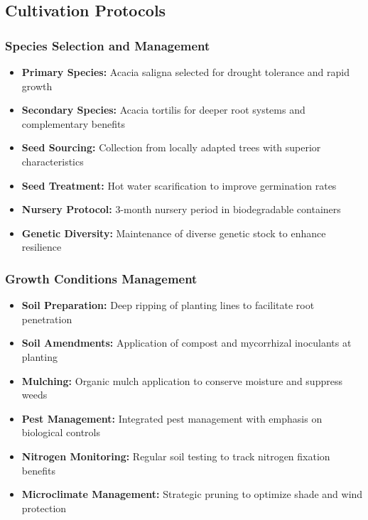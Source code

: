 \subsection{Cultivation Protocols}

\subsubsection{Species Selection and Management}
\begin{itemize}
    \item \textbf{Primary Species:} Acacia saligna selected for drought tolerance and rapid growth
    \item \textbf{Secondary Species:} Acacia tortilis for deeper root systems and complementary benefits
    \item \textbf{Seed Sourcing:} Collection from locally adapted trees with superior characteristics
    \item \textbf{Seed Treatment:} Hot water scarification to improve germination rates
    \item \textbf{Nursery Protocol:} 3-month nursery period in biodegradable containers
    \item \textbf{Genetic Diversity:} Maintenance of diverse genetic stock to enhance resilience
\end{itemize}

\subsubsection{Growth Conditions Management}
\begin{itemize}
    \item \textbf{Soil Preparation:} Deep ripping of planting lines to facilitate root penetration
    \item \textbf{Soil Amendments:} Application of compost and mycorrhizal inoculants at planting
    \item \textbf{Mulching:} Organic mulch application to conserve moisture and suppress weeds
    \item \textbf{Pest Management:} Integrated pest management with emphasis on biological controls
    \item \textbf{Nitrogen Monitoring:} Regular soil testing to track nitrogen fixation benefits
    \item \textbf{Microclimate Management:} Strategic pruning to optimize shade and wind protection
\end{itemize}


